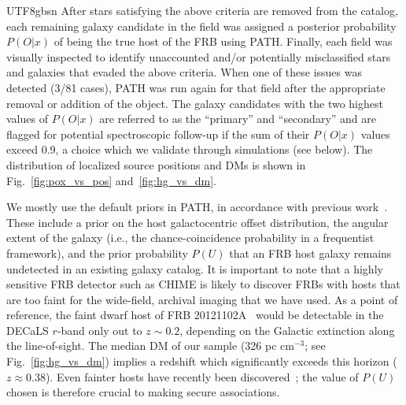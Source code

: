 \documentclass[twocolumn,linenumbers]{aastex631}
\begin{document}
\begin{CJK*}{UTF8}{gbsn}
After stars satisfying the above criteria are removed from the catalog, each remaining galaxy candidate in the field was assigned a posterior probability $P(O|x)$ of being the true host of the FRB using 
PATH. Finally, each field was visually inspected to identify unaccounted and/or potentially misclassified stars and galaxies that evaded the above criteria. When one of these issues was detected (3/81 cases), PATH was run again for that field after the appropriate removal or addition of the object. The galaxy candidates with the two highest values of $P(O|x)$ are referred to as the ``primary'' and ``secondary'' and are flagged for potential spectroscopic follow-up if the sum of their $P(O|x)$ values exceed 0.9, a choice which we validate through simulations (see below). The distribution of localized source positions and DMs is shown in Fig.~\ref{fig:pox_vs_pos} and~\ref{fig:hg_vs_dm}.

We mostly use the default priors in PATH, in accordance with previous work~\citep[e.g.,][]{law2024deep}. These include a prior on the host galactocentric offset distribution, the angular extent of the galaxy (i.e., the chance-coincidence probability in a frequentist framework), and the prior probability $P(U)$ that an FRB host galaxy remains undetected in an existing galaxy catalog. It is important to note that a highly sensitive 
FRB detector such as CHIME is likely to discover FRBs with hosts that are too faint for the wide-field, archival imaging that
we have used. As a point of reference, the faint dwarf host of FRB 20121102A~\citep{tendulkar2017host} would be detectable in the DECaLS $r$-band only out to $z \sim 0.2$, depending on the Galactic extinction along the line-of-sight. The median DM of our sample (326 pc cm$^{-3}$; see Fig.~\ref{fig:hg_vs_dm}) implies a redshift which significantly exceeds this horizon ($z \approx 0.38$). Even fainter hosts have recently been discovered~\citep{hewitt2024repeating};
the value of $P(U)$ chosen is therefore crucial to making secure associations.


\end{CJK*}
\end{document}
